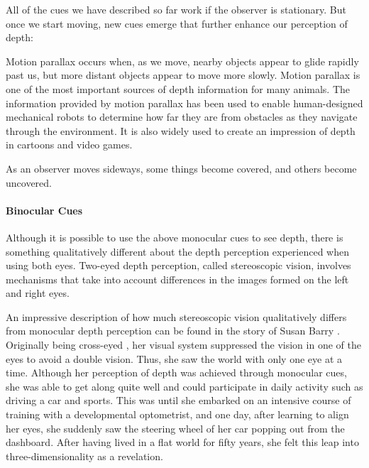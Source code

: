 All of the cues we have described so far work if the observer is stationary. But once we start moving, new cues emerge that further enhance our perception of depth:
\begin{my_list_desc}
	\item[Motion Parallax]
		Motion parallax occurs when, as we move, nearby objects appear to glide rapidly past us, but more distant objects appear to move more slowly.
		Motion parallax is one of the most important sources of depth information for many animals. 
		The information provided by motion parallax has been used to enable human-designed mechanical robots to determine how far they are from obstacles as they navigate through the environment.
		It is also widely used to create an impression of depth in cartoons and video games.
	
	\item[Deletion and Accretion]
		As an observer moves sideways, some things become covered, and others become uncovered.
\end{my_list_desc}


\paragraph{Binocular Cues}
Although it is possible to use the above monocular cues to see depth, there is something qualitatively different about the depth perception experienced when using both eyes.
Two-eyed depth perception, called stereoscopic vision, involves mechanisms that take into account differences in the images formed on the left and right eyes.

An impressive description of how much stereoscopic vision qualitatively differs from monocular depth perception can be found in the story of Susan Barry \cite{Barry:2009:FixingMyGaze}.
Originally being cross-eyed , her visual system suppressed the vision in one of the eyes to avoid a double vision.
Thus, she saw the world with only one eye at a time.
Although her perception of depth was achieved through monocular cues, she was able to get along quite well and could participate in daily activity such as driving a car and sports.
This was until she embarked on an intensive course of training with a developmental optometrist, and one day, after learning to align her eyes, she suddenly saw the steering wheel of her car popping out from the dashboard.
After having lived in a flat world for fifty years, she felt this leap into three-dimensionality as a revelation.

